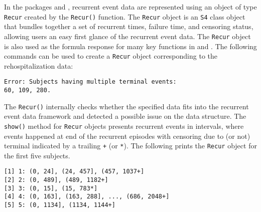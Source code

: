 In the packages  and , recurrent event data are
represented using an object of type \texttt{Recur} created by the
\texttt{Recur()} function. The \texttt{Recur} object is an \texttt{S4}
class object that bundles together a set of recurrent times, failure
time, and censoring status, allowing users an easy first glance of the
recurrent event data. The \texttt{Recur} object is also used as the
formula response for many key functions in  and .
The following commands can be used to create a \texttt{Recur} object
corresponding to the rehospitalization data:

\begin{Shaded}
\begin{Highlighting}[]
 \NormalTok{)}
\end{Highlighting}
\end{Shaded}

\begin{verbatim}
Error: Subjects having multiple terminal events:
60, 109, 280.
\end{verbatim}

The \texttt{Recur()} internally checks whether the specified data fits
into the recurrent event data framework and detected a possible issue on
the data structure. The \texttt{show()} method for \texttt{Recur}
objects presents recurrent events in intervals, where events happened at
end of the recurrent episodes with censoring due to (or not) terminal
indicated by a trailing \texttt{+} (or \texttt{*}). The following prints
the \texttt{Recur} object for the first five subjects.

\begin{Shaded}
\begin{Highlighting}[]
\NormalTok{(readmission[}\NormalTok{:}\NormalTok{,], }
\end{Highlighting}
\end{Shaded}

\begin{verbatim}
[1] 1: (0, 24], (24, 457], (457, 1037+]       
[2] 2: (0, 489], (489, 1182+]                 
[3] 3: (0, 15], (15, 783*]                    
[4] 4: (0, 163], (163, 288], ..., (686, 2048+]
[5] 5: (0, 1134], (1134, 1144+]               
\end{verbatim}
